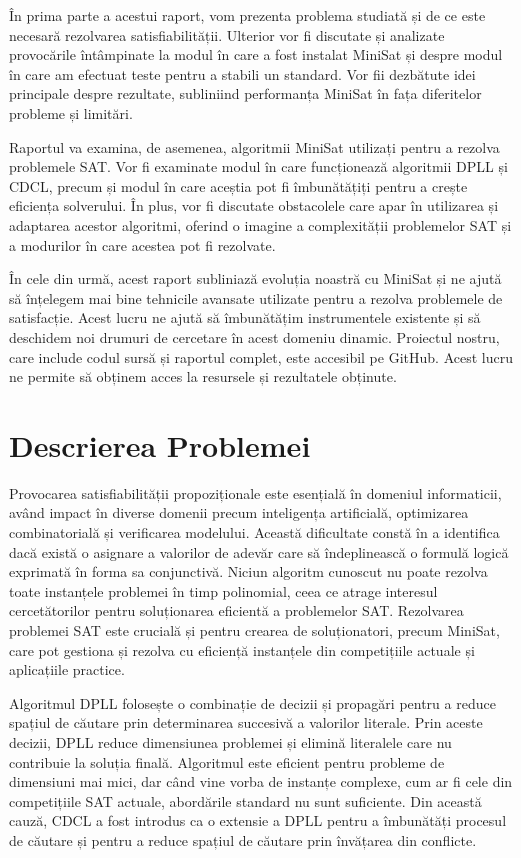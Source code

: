 \documentclass[12pt,a4paper]{report}
\begin{document}
În prima parte a acestui raport, vom prezenta problema studiată și de ce este necesară rezolvarea satisfiabilității. Ulterior vor fi discutate și analizate provocările întâmpinate la modul în care a fost instalat MiniSat și despre modul în care am efectuat teste pentru a stabili un standard. Vor fii dezbătute idei principale despre rezultate, subliniind performanța MiniSat în fața diferitelor probleme și limitări.\cite{b6}

Raportul va examina, de asemenea, algoritmii MiniSat utilizați pentru a rezolva problemele SAT. Vor fi examinate  modul în care funcționează algoritmii DPLL și CDCL, precum și modul în care aceștia pot fi îmbunătățiți pentru a crește eficiența solverului. În plus, vor fi discutate obstacolele care apar în utilizarea și adaptarea acestor algoritmi, oferind o imagine a complexității problemelor SAT și a modurilor în care acestea pot fi rezolvate.\cite{b7}

În cele din urmă, acest raport subliniază evoluția noastră cu MiniSat și ne ajută să înțelegem mai bine tehnicile avansate utilizate pentru a rezolva problemele de satisfacție. Acest lucru ne ajută să îmbunătățim instrumentele existente și să deschidem noi drumuri de cercetare în acest domeniu dinamic. Proiectul nostru, care include codul sursă și raportul complet, este accesibil pe GitHub. Acest lucru ne permite să obținem acces la resursele și rezultatele obținute.
\cite{b8}
\cite{b9}


\newpage


\section{Descrierea Problemei}
Provocarea satisfiabilității propoziționale este esențială în domeniul informaticii, având impact în diverse domenii precum inteligența artificială, optimizarea combinatorială și verificarea modelului. Această dificultate constă în a identifica dacă există o asignare a valorilor de adevăr care să îndeplinească o formulă logică exprimată în forma sa conjunctivă. Niciun algoritm cunoscut nu poate rezolva toate instanțele problemei în timp polinomial, ceea ce atrage interesul cercetătorilor pentru soluționarea eficientă a problemelor SAT. Rezolvarea problemei SAT este crucială și pentru crearea de soluționatori, precum MiniSat, care pot gestiona și rezolva cu eficiență instanțele din competițiile actuale și aplicațiile practice.

Algoritmul DPLL folosește o combinație de decizii și propagări pentru a reduce spațiul de căutare prin determinarea succesivă a valorilor literale. Prin aceste decizii, DPLL reduce dimensiunea problemei și elimină literalele care nu contribuie la soluția finală. Algoritmul este eficient pentru probleme de dimensiuni mai mici, dar când vine vorba de instanțe complexe, cum ar fi cele din competițiile SAT actuale, abordările standard nu sunt suficiente. Din această cauză, CDCL a fost introdus ca o extensie a DPLL pentru a îmbunătăți procesul de căutare și pentru a reduce spațiul de căutare prin învățarea din conflicte.
\end{document}
